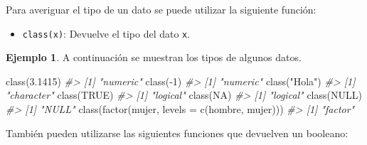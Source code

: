 \documentclass[
]{book}
\newenvironment{Shaded}{\begin{snugshade}}{\end{snugshade}}
\newcommand{\AttributeTok}[1]{\textcolor[rgb]{0.77,0.63,0.00}{#1}}
\newcommand{\CommentTok}[1]{\textcolor[rgb]{0.56,0.35,0.01}{\textit{#1}}}
\newcommand{\ConstantTok}[1]{\textcolor[rgb]{0.00,0.00,0.00}{#1}}
\newcommand{\DecValTok}[1]{\textcolor[rgb]{0.00,0.00,0.81}{#1}}
\newcommand{\FloatTok}[1]{\textcolor[rgb]{0.00,0.00,0.81}{#1}}
\newcommand{\FunctionTok}[1]{\textcolor[rgb]{0.00,0.00,0.00}{#1}}
\newcommand{\NormalTok}[1]{#1}
\newcommand{\SpecialCharTok}[1]{\textcolor[rgb]{0.00,0.00,0.00}{#1}}
\newcommand{\StringTok}[1]{\textcolor[rgb]{0.31,0.60,0.02}{#1}}
\providecommand{\tightlist}{%
  \setlength{\itemsep}{0pt}\setlength{\parskip}{0pt}}
\theoremstyle{definition}
\theoremstyle{definition}
\newtheorem{example}{Ejemplo}[chapter]
\theoremstyle{definition}
\theoremstyle{definition}
\theoremstyle{remark}
\begin{document}
Para averiguar el tipo de un dato se puede utilizar la siguiente función:

\begin{itemize}
\tightlist
\item
  \texttt{class(x)}: Devuelve el tipo del dato \texttt{x}.
\end{itemize}

\begin{example}

A continuación se muestran los tipos de algunos datos.

\begin{Shaded}
\begin{Highlighting}[]
\FunctionTok{class}\NormalTok{(}\FloatTok{3.1415}\NormalTok{)}
\CommentTok{\#\textgreater{} [1] "numeric"}
\FunctionTok{class}\NormalTok{(}\SpecialCharTok{{-}}\DecValTok{1}\NormalTok{)}
\CommentTok{\#\textgreater{} [1] "numeric"}
\FunctionTok{class}\NormalTok{(}\StringTok{"Hola"}\NormalTok{)}
\CommentTok{\#\textgreater{} [1] "character"}
\FunctionTok{class}\NormalTok{(}\ConstantTok{TRUE}\NormalTok{)}
\CommentTok{\#\textgreater{} [1] "logical"}
\FunctionTok{class}\NormalTok{(}\ConstantTok{NA}\NormalTok{)}
\CommentTok{\#\textgreater{} [1] "logical"}
\FunctionTok{class}\NormalTok{(}\ConstantTok{NULL}\NormalTok{)}
\CommentTok{\#\textgreater{} [1] "NULL"}
\FunctionTok{class}\NormalTok{(}\FunctionTok{factor}\NormalTok{(}\StringTok{\textquotesingle{}mujer\textquotesingle{}}\NormalTok{, }\AttributeTok{levels =} \FunctionTok{c}\NormalTok{(}\StringTok{\textquotesingle{}hombre\textquotesingle{}}\NormalTok{, }\StringTok{\textquotesingle{}mujer\textquotesingle{}}\NormalTok{)))}
\CommentTok{\#\textgreater{} [1] "factor"}
\end{Highlighting}
\end{Shaded}

\end{example}

También pueden utilizarse las siguientes funciones que devuelven un booleano:
\end{document}
